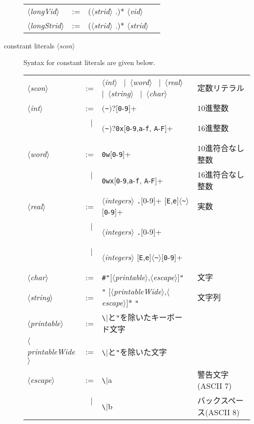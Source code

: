 \documentclass{jbook}
\newcommand{\txt}[2]{#2}
\newcommand{\vbar}{\mbox{\ $|$\ }}
\newcommand{\nonterm}[1]{\mbox{$\langle$}{\it #1}\mbox{$\rangle$}}
\newcommand{\term}[1]{\mbox{{\tt #1}}}
\newcommand{\optionalBegin}{\mbox{$($}}
\newcommand{\optionalEnd}{\mbox{$)?$}}
\begin{document}
\begin{description}
\begin{center}
\begin{tabular}{lcll}
\nonterm{longVid} &:=& (\nonterm{strid} .)* \nonterm{vid}\\
\nonterm{longStrid} &:=& (\nonterm{strid} .)* \nonterm{strid}
\end{tabular}
\end{center}


\item[\txt{定数リテラル \nonterm{scon}}{constrant literals \nonterm{scon}}] 
\label{sec:lexicalItems:constants}
\txt{
定数リテラルの定義は以下の通りである．
}
{
Syntax for constant literals are given below.
}

\ifjp%
\begin{center}
\begin{tabular}{lcll}
\nonterm{scon} &:=& 
\nonterm{int} 
\vbar \nonterm{word} 
\vbar \nonterm{real} 
\vbar \nonterm{string} 
\vbar \nonterm{char}
&定数リテラル\\
\nonterm{int} &:=& 
\optionalBegin\verb|~|\optionalEnd[\term{0}-\term{9}]+ & 10進整数\\
&\vbar& \optionalBegin\verb|~|\optionalEnd\verb|0x|[\term{0}-\term{9},\term{a}-\term{f},%
\term{A}-\term{F}]+& 16進整数
\\[0.5ex]
\nonterm{word} &:=& \verb|0w|[\term{0}-\term{9}]+&10進符合なし整数
\\
&\vbar&\verb|0wx|[\term{0}-\term{9},\term{a}-\term{f},%
\term{A}-\term{F}]+& 16進符合なし整数
\\[0.5ex]
\nonterm{real}&:=& 
\nonterm{integers} \term{.}[0-9]+
[\term{E},\term{e}]$\langle$\verb|~|$\rangle$[\term{0}-\term{9}]+
&実数\\
&\vbar&\nonterm{integers} \term{.}[0-9]+ 
&\\
&\vbar&\nonterm{integers} 
[\term{E},\term{e}]$\langle$\verb|~|$\rangle$[\term{0}-\term{9}]+
&\\
\nonterm{char} &:=& \verb|#"|[\nonterm{printable},\nonterm{escape}]\verb|"|&文字\\
\nonterm{string} &:=& \verb|"| [\nonterm{printableWide},\nonterm{escape}]$*$ \verb|"|&文字列\\
\nonterm{printable} &:=& \verb|\|と\verb|"|を除いたキーボード文字\\
\nonterm{printableWide} &:=&\verb|\|と\verb|"|を除いた文字\\
\nonterm{escape} &:=& \verb|\|a & 警告文字(ASCII 7)\\
&\vbar&\verb|\|b & バックスペース(ASCII 8)\\

\end{tabular}
\end{center}
\end{description}
\end{document}
